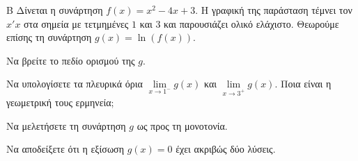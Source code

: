 \begin{thema}{Β}
Δίνεται η συνάρτηση $f(x) = x^2 - 4x + 3$. Η γραφική της παράσταση τέμνει τον $x'x$ στα σημεία με τετμημένες $1$ και $3$ και παρουσιάζει ολικό ελάχιστο. Θεωρούμε επίσης τη συνάρτηση $g(x) = \ln(f(x))$.
\begin{erwthma}
  \item Να βρείτε το πεδίο ορισμού της $g$.
  \item Να υπολογίσετε τα πλευρικά όρια $\lim\limits_{x \to 1^-} g(x)$ και $\lim\limits_{x \to 3^+} g(x)$. Ποια είναι η γεωμετρική τους ερμηνεία;
  \item Να μελετήσετε τη συνάρτηση $g$ ως προς τη μονοτονία.
  \item Να αποδείξετε ότι η εξίσωση $g(x) = 0$ έχει ακριβώς δύο λύσεις.
\end{erwthma}
\end{thema}
